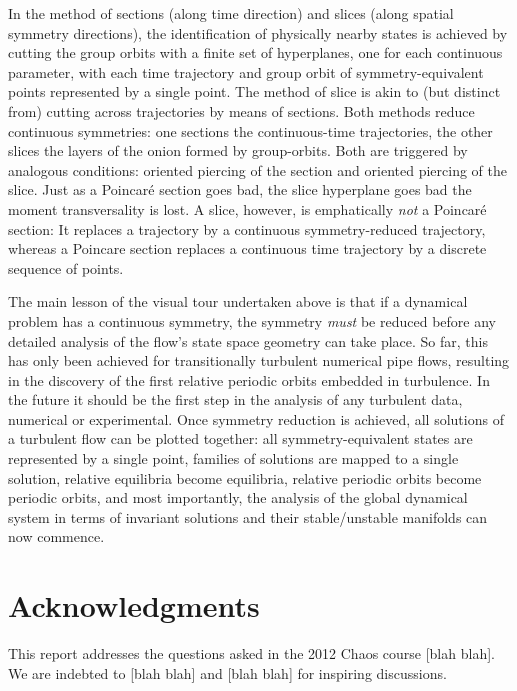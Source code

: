 \documentclass{article}
\begin{document}
In the method of sections (along time direction) and slices (along
spatial symmetry directions), the identification of physically nearby
states is achieved by cutting the group orbits with a finite set of
hyperplanes, one for each continuous parameter, with each time trajectory
and group orbit of symmetry-equivalent points represented by a single
point. The method of slice is akin to (but distinct
from) cutting across trajectories by means of sections. Both methods
reduce continuous symmetries: one sections the continuous-time
trajectories, the other slices the layers of the onion formed by
group-orbits. Both are triggered by analogous conditions: oriented
piercing of the section and oriented piercing of the slice. Just as a
 Poincar\'e section goes bad, the slice hyperplane goes bad the moment
transversality is lost. A slice, however, is emphatically \emph{not} a
Poincar\'e section: It replaces a trajectory by a continuous symmetry-reduced
trajectory, whereas a Poincare section replaces a continuous time trajectory by
a discrete sequence of points.

The main lesson of the visual tour undertaken above is that if a
dynamical problem has a continuous symmetry, the symmetry \emph{must} be
reduced before any detailed analysis of the flow's state space geometry
can take place. So far, this has only been achieved for transitionally
turbulent numerical pipe flows,\cite{ACHKW11} resulting in the discovery
of the first relative periodic orbits embedded in turbulence. In the
future it should be the first step in the analysis of any turbulent data,
numerical\cite{CvGr12} or experimental.\cite{BCS12} Once symmetry
reduction is achieved, all solutions of a turbulent flow can be plotted
together: all symmetry-equivalent states are represented by a single
point, families of solutions are mapped to a single solution, relative
equilibria become equilibria, relative periodic orbits become periodic
orbits, and most importantly, the analysis of the global dynamical system
in terms of invariant solutions and their stable/unstable manifolds can
now commence.

\section*{Acknowledgments}
This report addresses the questions asked in the  2012 Chaos course
[blah blah]. We are indebted to [blah blah] and [blah blah] for inspiring discussions.





\end{document}
